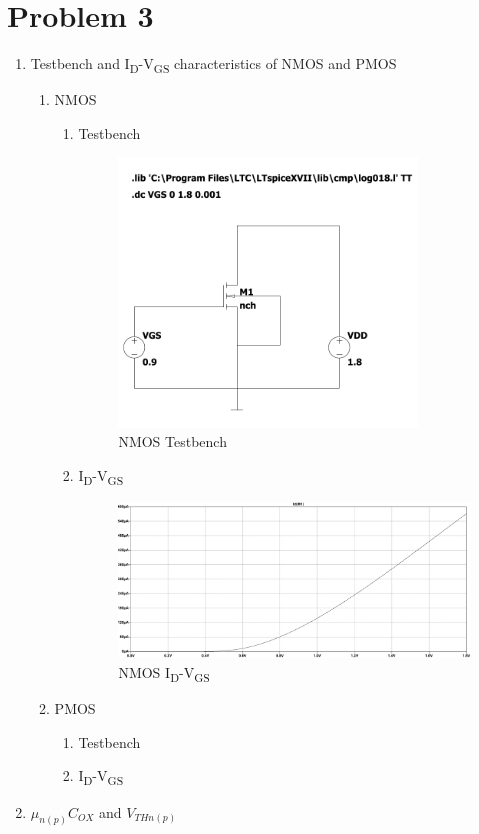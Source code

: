 \documentclass{article}
\begin{document}
\section{Problem 3}
\label{sec:orge891bc5}
\begin{enumerate}
\item Testbench and I\textsubscript{D}-V\textsubscript{GS} characteristics of NMOS and PMOS
\begin{enumerate}
\item NMOS
\begin{enumerate}
\item Testbench
\begin{figure}[H]
\centering
\includegraphics[width=300px]{img/q3/a/nmos-testbench.pdf}
\caption{\label{fig:nmos-testbench}NMOS Testbench}
\end{figure}
\item I\textsubscript{D}-V\textsubscript{GS}
\begin{figure}[H]
\centering
\includegraphics[width=.9\linewidth]{img/q3/a/nmos-id-vgs.pdf}
\caption{\label{fig:nmos-id-vgs}NMOS I\textsubscript{D}-V\textsubscript{GS}}
\end{figure}
\end{enumerate}
\item PMOS
\begin{enumerate}
\item Testbench
\item I\textsubscript{D}-V\textsubscript{GS}
\end{enumerate}
\end{enumerate}
\item \(\mu_{n(p)}C_{OX}\) and \(V_{THn(p)}\)


\end{enumerate}
\end{document}
